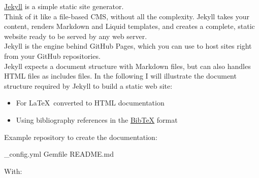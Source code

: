 \href{https://jekyllrb.com}{Jekyll} is a simple static site generator. \\
Think of it like a file-based CMS, without all the complexity. Jekyll takes your content, renders Markdown and Liquid templates, 
and creates a complete, static website ready to be served by any web server. \\
Jekyll is the engine behind GitHub Pages, which you can use to host sites right from your GitHub repositories. \\[0.25cm]
Jekyll expects a document structure with Markdown files, but can also handles HTML files as includes files. 
In the following I will illustrate the document structure required by Jekyll to build a static web site: 
\begin{itemize}
\item For \LaTeX\ converted to HTML documentation
\item Using bibliography references in the \href{https://www.bibtex.org/}{Bib\TeX} format
\end{itemize}
Example repository to create the documentation: 
{\footnotesize{ 
\begin{script}
 
      \_config.yml  Gemfile    README.md
\end{script}
}}
\noindent With:

